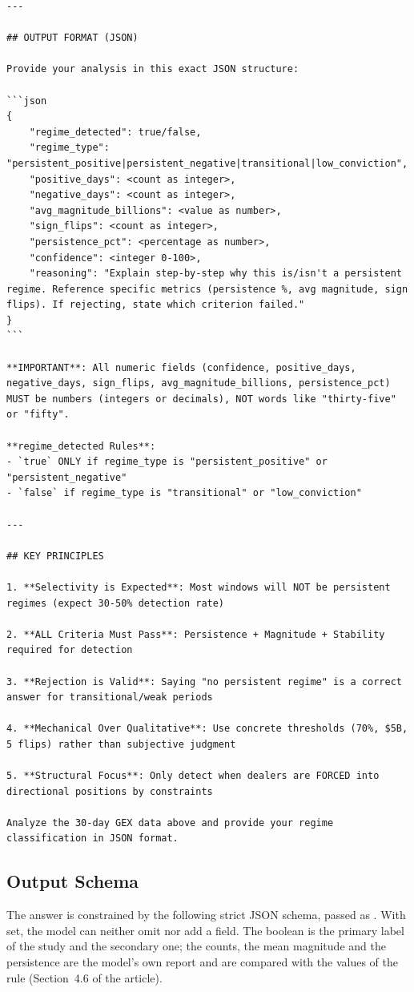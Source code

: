 \begin{lstlisting}[style=prompt]
---

## OUTPUT FORMAT (JSON)

Provide your analysis in this exact JSON structure:

```json
{
    "regime_detected": true/false,
    "regime_type": "persistent_positive|persistent_negative|transitional|low_conviction",
    "positive_days": <count as integer>,
    "negative_days": <count as integer>,
    "avg_magnitude_billions": <value as number>,
    "sign_flips": <count as integer>,
    "persistence_pct": <percentage as number>,
    "confidence": <integer 0-100>,
    "reasoning": "Explain step-by-step why this is/isn't a persistent regime. Reference specific metrics (persistence %, avg magnitude, sign flips). If rejecting, state which criterion failed."
}
```

**IMPORTANT**: All numeric fields (confidence, positive_days, negative_days, sign_flips, avg_magnitude_billions, persistence_pct) MUST be numbers (integers or decimals), NOT words like "thirty-five" or "fifty".

**regime_detected Rules**:
- `true` ONLY if regime_type is "persistent_positive" or "persistent_negative"
- `false` if regime_type is "transitional" or "low_conviction"

---

## KEY PRINCIPLES

1. **Selectivity is Expected**: Most windows will NOT be persistent regimes (expect 30-50% detection rate)

2. **ALL Criteria Must Pass**: Persistence + Magnitude + Stability required for detection

3. **Rejection is Valid**: Saying "no persistent regime" is a correct answer for transitional/weak periods

4. **Mechanical Over Qualitative**: Use concrete thresholds (70%, $5B, 5 flips) rather than subjective judgment

5. **Structural Focus**: Only detect when dealers are FORCED into directional positions by constraints

Analyze the 30-day GEX data above and provide your regime classification in JSON format.
\end{lstlisting}

\subsection{Output Schema}
\label{app:prompt:schema}

The answer is constrained by the following strict JSON schema, passed as . With  set, the model can neither omit nor add a field. The boolean  is the primary label of the study and  the secondary one; the counts, the mean magnitude and the persistence are the model's own report and are compared with the values of the rule (Section~4.6 of the article).

